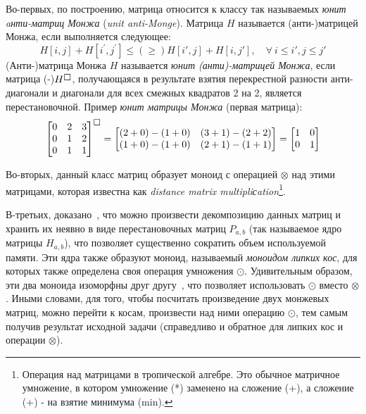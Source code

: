 Во-первых, по построению, матрица относится к классу так называемых  \emph{юнит aнти-матриц Монжа} (\emph{unit anti-Monge}).
Матрица $H$ называется (анти-)матрицей Монжа, если выполняется следующее:
\begin{equation}
    H[i, j] + H[i^{'},j^{'}] \leq(\geq) H[i', j] + H[i,j'] ,\quad \forall \: i \leq i' , j \leq j'
\end{equation}
(Анти-)матрица Монжа $H$ называется \emph{юнит (анти)-матрицей Монжа}, если матрица (-)$H^{\msquare}$, получающаяся в результате взятия перекрестной разности анти-диагонали и диагонали для всех смежных квадратов 2 на 2,   является перестановочной. Пример \emph{юнит матрицы Монжа} (первая матрица):
\begin{equation}
\begin{bmatrix}
0 & 2 & 3 \\
0 & 1 & 2 \\
0 & 1 & 1
\end{bmatrix} ^ { \msquare} =
\begin{bmatrix}
(2 + 0) - (1 + 0)  & (3 + 1) - (2 + 2)  \\
(1 + 0) - (1 + 0) &  (2 + 1) - (1 + 1) 
\end{bmatrix} = 
\begin{bmatrix}
1 & 0  \\
0 & 1 
\end{bmatrix} 
\end{equation}


Во-вторых, данный класс матриц образует моноид с операцией $\otimes$ над этими матрицами, которая известна как \emph{distance matrix multipliсation}\footnote{Операция над матрицами в тропической алгебре. Это обычное матричное умножение, в котором умножение (*) заменено на сложение (+), а сложение (+) - на взятие минимума (min).}.

В-третьих, доказано~\cite{tiskin2006all}, что можно произвести декомпозицию данных матриц и хранить их неявно в виде перестановочных матриц  $P_{a,b}$ (так называемое ядро матрицы $H_{a,b}$), что позволяет существенно сократить объем используемой памяти.
Эти ядра также образуют моноид, называемый \emph{моноидом липких кос}, для которых также определена своя операция умножения $\odot$.
Удивительным образом, эти два моноида изоморфны друг другу~\cite{tiskin2006all}, что позволяет использовать $\odot$ вместо $\otimes$. 
Иными словами, для того, чтобы посчитать произведение двух монжевых матриц, можно перейти к косам, произвести над ними операцию $\odot$, тем самым получив результат исходной задачи (справедливо и обратное для липких кос и операции $\otimes$).
    
